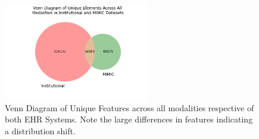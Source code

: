 \documentclass{article}
\theoremstyle{plain}
\theoremstyle{definition}
\theoremstyle{remark}
\begin{document}
{\begin{figure}[h!]
\vskip 0.2in
\begin{center}
\label{bar}
\centerline{\includegraphics[width=2.5in]{plots/venn.png}}
\caption{Venn Diagram of Unique Features across all modalities respective of both EHR Systems. Note the large differences in features indicating a distribution shift.}
\label{venn}
\end{center}
\vskip -0.2in
\end{figure}






}
\end{document}
